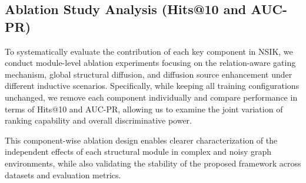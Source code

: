 \documentclass[preprint,12pt]{elsarticle}
\begin{document}
\subsection{Ablation Study Analysis (Hits@10 and AUC-PR)}

To systematically evaluate the contribution of each key component in NSIK, we conduct module-level ablation experiments focusing on the relation-aware gating mechanism, global structural diffusion, and diffusion source enhancement under different inductive scenarios. Specifically, while keeping all training configurations unchanged, we remove each component individually and compare performance in terms of Hits@10 and AUC-PR, allowing us to examine the joint variation of ranking capability and overall discriminative power.

This component-wise ablation design enables clearer characterization of the independent effects of each structural module in complex and noisy graph environments, while also validating the stability of the proposed framework across datasets and evaluation metrics.

\begin{table}[ht]
\centering
\small
\caption{Ablation Study on Key Components of NSIK (Hits@10, \%) over Inductive Benchmarks (v1--v4 and Avg.)}
\label{tab:ablation}
\end{table}
\end{document}
